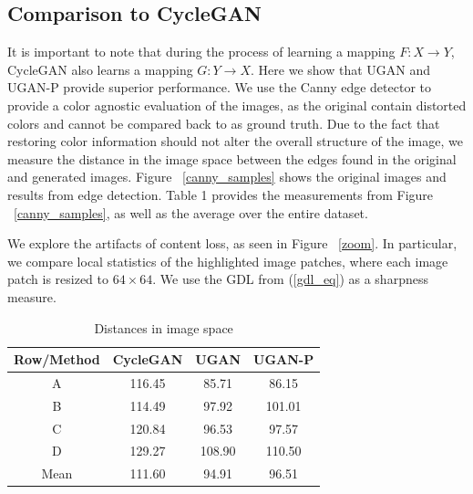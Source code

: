 \documentclass[letterpaper, 10pt, conference]{ieeeconf}
\begin{document}
\subsection{Comparison to CycleGAN}
It is important to note that during the process of learning a mapping $F: X \rightarrow Y$, CycleGAN also learns a
mapping $G: Y \rightarrow X$. Here we show that UGAN and UGAN-P provide superior performance. We use the Canny edge
detector \cite{canny1986computational} to provide a color agnostic evaluation of the images, as the original contain
distorted colors and cannot be compared back to as ground truth. Due to the fact that restoring color information
should not alter the overall structure of the image, we measure the distance in the image space between the edges
found in the original and generated images. Figure ~\ref{canny_samples} shows the original images and results from
edge detection. Table 1 provides the measurements from Figure ~\ref{canny_samples}, as well as the average over the
entire dataset.

We explore the artifacts of content loss, as seen in Figure ~\ref{zoom}. In particular, we compare local statistics
of the highlighted image patches, where each image patch is resized to $64 \times 64$. We use the GDL
\cite{mathieu2015deep} from (\ref{gdl_eq}) as a sharpness measure. 

\begin{table}
\centering
\caption{Distances in image space}
\begin{tabular}{| c | c | c | c |}
   \hline
   Row/Method & CycleGAN & UGAN & UGAN-P \\ \hline
   A          & 116.45 & 85.71  & 86.15  \\ \hline
   B          & 114.49 & 97.92  & 101.01 \\ \hline
   C          & 120.84 & 96.53  & 97.57  \\ \hline
   D          & 129.27 & 108.90 & 110.50 \\ \hline
   Mean       & 111.60 & 94.91  & 96.51 \\ \hline
\end{tabular}
\end{table}

\newpage
\end{document}
